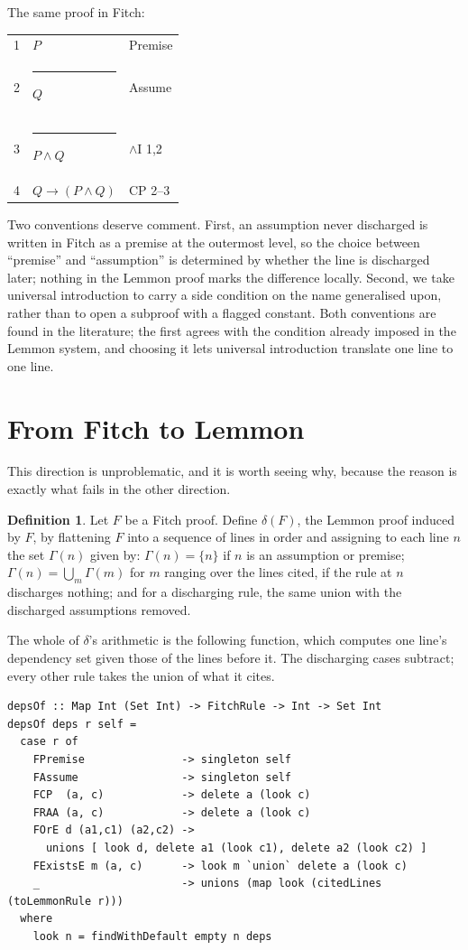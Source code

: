 \documentclass[11pt]{article}
\makeatletter
\theoremstyle{plain}
\theoremstyle{definition}
\newtheorem{definition}[theorem]{Definition}
\theoremstyle{remark}
\newcommand{\fbar}{\rule[-0.7ex]{0.4pt}{2.6ex}\hspace{0.7em}}
\newenvironment{fitchproof}
  {\begin{center}\begin{tabular}{@{}r@{\hspace{1em}}l@{\hspace{2.5em}}l@{}}}
  {\end{tabular}\end{center}}
\makeatother
\begin{document}
The same proof in Fitch:

\begin{fitchproof}
1 &                 $P$                  & Premise \\
2 & \fbar           $Q$                  & Assume \\
3 & \fbar           $P \wedge Q$         & $\wedge$I 1,2 \\
4 &                 $Q \to (P \wedge Q)$ & CP 2--3 \\
\end{fitchproof}

Two conventions deserve comment. First, an assumption never discharged is
written in Fitch as a premise at the outermost level, so the choice between
``premise'' and ``assumption'' is determined by whether the line is discharged
later; nothing in the Lemmon proof marks the difference locally. Second, we
take universal introduction to carry a side condition on the name generalised
upon, rather than to open a subproof with a flagged constant. Both conventions
are found in the literature; the first agrees with the condition already
imposed in the Lemmon system, and choosing it lets universal introduction
translate one line to one line.

\section{From Fitch to Lemmon}\label{sec:fitch-to-lemmon}

This direction is unproblematic, and it is worth seeing why, because the
reason is exactly what fails in the other direction.

\begin{definition}
Let $F$ be a Fitch proof. Define $\delta(F)$, the Lemmon proof induced by $F$,
by flattening $F$ into a sequence of lines in order and assigning to each line
$n$ the set $\Gamma(n)$ given by: $\Gamma(n) = \{n\}$ if $n$ is an assumption
or premise; $\Gamma(n) = \bigcup_{m} \Gamma(m)$ for $m$ ranging over the lines
cited, if the rule at $n$ discharges nothing; and for a discharging rule,
the same union with the discharged assumptions removed.
\end{definition}

The whole of $\delta$'s arithmetic is the following function, which computes
one line's dependency set given those of the lines before it. The
discharging cases subtract; every other rule takes the union of what it cites.

\begin{lstlisting}
depsOf :: Map Int (Set Int) -> FitchRule -> Int -> Set Int
depsOf deps r self =
  case r of
    FPremise               -> singleton self
    FAssume                -> singleton self
    FCP  (a, c)            -> delete a (look c)
    FRAA (a, c)            -> delete a (look c)
    FOrE d (a1,c1) (a2,c2) ->
      unions [ look d, delete a1 (look c1), delete a2 (look c2) ]
    FExistsE m (a, c)      -> look m `union` delete a (look c)
    _                      -> unions (map look (citedLines (toLemmonRule r)))
  where
    look n = findWithDefault empty n deps
\end{lstlisting}
\end{document}
